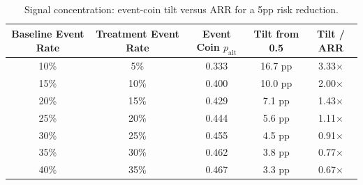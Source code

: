 \begin{table}[htbp]
\centering
\caption{Signal concentration: event-coin tilt versus ARR for a 5pp risk reduction.}
\begin{tabular}{@{}ccccc@{}}
\toprule
Baseline Event Rate & Treatment Event Rate & Event Coin $p_{\text{alt}}$ & Tilt from 0.5 & Tilt / ARR \\
\midrule
10\% & 5\% & 0.333 & 16.7 pp & 3.33$\times$ \\
15\% & 10\% & 0.400 & 10.0 pp & 2.00$\times$ \\
20\% & 15\% & 0.429 & 7.1 pp & 1.43$\times$ \\
25\% & 20\% & 0.444 & 5.6 pp & 1.11$\times$ \\
30\% & 25\% & 0.455 & 4.5 pp & 0.91$\times$ \\
35\% & 30\% & 0.462 & 3.8 pp & 0.77$\times$ \\
40\% & 35\% & 0.467 & 3.3 pp & 0.67$\times$ \\
\bottomrule
\end{tabular}
\label{tab:signal_concentration}
\end{table}
